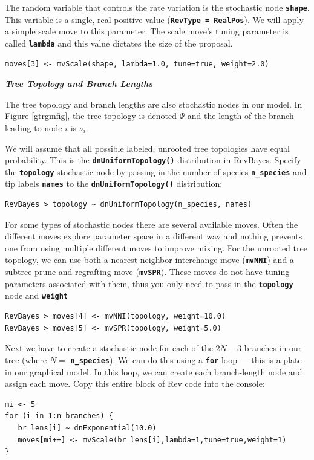 \documentclass[11pt]{article}
\newcommand{\cl}[1]{{\texttt{\textbf{#1}}}}
\begin{document}
The random variable that controls the rate variation is the stochastic node \cl{shape}. This variable is a single, real positive value (\cl{RevType = RealPos}). 
We will apply a simple scale move to this parameter.
The scale move's tuning parameter is called \cl{lambda} and this value dictates the size of the proposal.
{\tt \begin{snugshade*}
\begin{lstlisting}
moves[3] <- mvScale(shape, lambda=1.0, tune=true, weight=2.0)\end{lstlisting}
\end{snugshade*}}


\textbf{\textit{Tree Topology and Branch Lengths}}

The tree topology and branch lengths are also stochastic nodes in our model. 
In Figure \ref{gtrgmfig}, the tree topology is denoted $\Psi$ and the length of the branch leading to node $i$ is $\nu_i$.

We will assume that all possible labeled, unrooted tree topologies have equal probability. This is the \cl{dnUniformTopology()} distribution in RevBayes. Specify the \cl{topology} stochastic node by passing in the number of species \cl{n\_species} and tip labels \cl{names} to the \cl{dnUniformTopology()} distribution:
{\tt \begin{snugshade*}
\begin{lstlisting}
RevBayes > topology ~ dnUniformTopology(n_species, names)
\end{lstlisting}
\end{snugshade*}}

For some types of stochastic nodes there are several available moves. 
Often the different moves explore parameter space in a different way and nothing prevents one from using multiple different moves to improve mixing. 
For the unrooted tree topology, we can use both a nearest-neighbor interchange move (\cl{mvNNI}) and a subtree-prune and regrafting move (\cl{mvSPR}). These moves do not have tuning parameters associated with them, thus you only need to pass in the \cl{topology} node and \cl{weight} 
{\tt \begin{snugshade*}
\begin{lstlisting}
RevBayes > moves[4] <- mvNNI(topology, weight=10.0)
RevBayes > moves[5] <- mvSPR(topology, weight=5.0)
\end{lstlisting}
\end{snugshade*}}


Next we have to create a stochastic node for each of the $2N-3$ branches in our tree (where $N=$ \cl{n\_species}). 
We can do this using a \cl{for} loop --- this is a plate in our graphical model. In this loop, we can create each branch-length node and assign each move. Copy this entire block of Rev code into the console:
{\tt \small \begin{snugshade*}
\begin{lstlisting}
mi <- 5
for (i in 1:n_branches) {
   br_lens[i] ~ dnExponential(10.0)
   moves[mi++] <- mvScale(br_lens[i],lambda=1,tune=true,weight=1) 
}
\end{lstlisting}
\end{snugshade*}}
\end{document}
